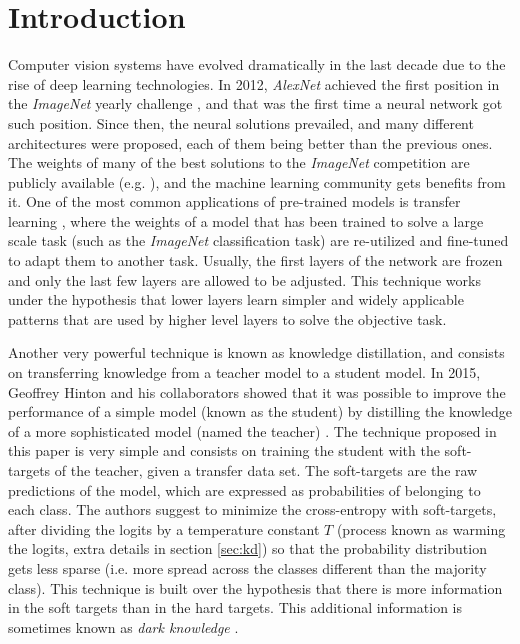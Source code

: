 \documentclass{elsarticle}
\begin{document}
	\section{Introduction}
	Computer vision systems have evolved dramatically in the last decade due to the rise of deep learning technologies. In 2012, \textit{AlexNet} \citep{krizhevsky2012} achieved the first position in the \textit{ImageNet} yearly challenge \citep{ILSVRC15}, and that was the first time a neural network got such position. Since then, the neural solutions prevailed, and many different architectures were proposed, each of them being better than the previous ones. The weights of many of the best solutions to the \textit{ImageNet} competition are publicly available (e.g. \cite{he2016, chollet2017, szegedy2016, szegedy2017, howard2017, pham2018, tan2019}), and the machine learning community gets benefits from it. One of the most common applications of pre-trained models is transfer learning \citep{zhuang2021}, where the weights of a model that has been trained to solve a large scale task (such as the \textit{ImageNet} classification task) are re-utilized and fine-tuned to adapt them to another task. Usually, the first layers of the network are frozen and only the last few layers are allowed to be adjusted. This technique works under the hypothesis that lower layers learn simpler and widely applicable patterns that are used by higher level layers to solve the objective task.	
	
	Another very powerful technique is known as knowledge distillation, and consists on transferring knowledge from a teacher model to a student model. In 2015, Geoffrey Hinton and his collaborators showed that it was possible to improve the performance of a simple model (known as the student) by distilling the knowledge of a more sophisticated model (named the teacher) \citep{hinton2015}. The technique proposed in this paper is very simple and consists on training the student with the soft-targets of the teacher, given a transfer data set. The soft-targets are the raw predictions of the model, which are expressed as probabilities of belonging to each class. The authors suggest to minimize the cross-entropy with soft-targets, after dividing the logits by a temperature constant $T$ (process known as warming the logits, extra details in section \ref{sec:kd}) so that the probability distribution gets less sparse (i.e. more spread across the classes different than the majority class). This technique is built over the hypothesis that there is more information in the soft targets than in the hard targets. This additional information is sometimes known as \textit{dark knowledge} \citep{gou2020}.
	
\end{document}
